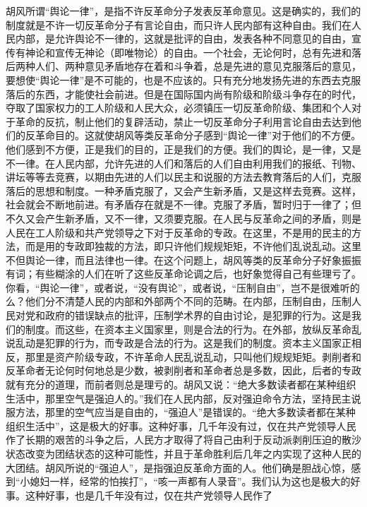 \documentclass[cn,11pt,chinese]{elegantbook}
\begin{document}
胡风所谓“舆论一律”，是指不许反革命分子发表反革命意见。这是确实的，我们的制度就是不许一切反革命分子有言论自由，而只许人民内部有这种自由。我们在人民内部，是允许舆论不一律的，这就是批评的自由，发表各种不同意见的自由，宣传有神论和宣传无神论（即唯物论）的自由。一个社会，无论何时，总有先进和落后两种人们、两种意见矛盾地存在着和斗争着，总是先进的意见克服落后的意见，要想使“舆论一律”是不可能的，也是不应该的。只有充分地发扬先进的东西去克服落后的东西，才能使社会前进。但是在国际国内尚有阶级和阶级斗争存在的时代，夺取了国家权力的工人阶级和人民大众，必须镇压一切反革命阶级、集团和个人对于革命的反抗，制止他们的复辟活动，禁止一切反革命分子利用言论自由去达到他们的反革命目的。这就使胡风等类反革命分子感到“舆论一律”对于他们的不方便。他们感到不方便，正是我们的目的，正是我们的方便。我们的舆论，是一律，又是不一律。在人民内部，允许先进的人们和落后的人们自由利用我们的报纸、刊物、讲坛等等去竞赛，以期由先进的人们以民主和说服的方法去教育落后的人们，克服落后的思想和制度。一种矛盾克服了，又会产生新矛盾，又是这样去竞赛。这样，社会就会不断地前进。有矛盾存在就是不一律。克服了矛盾，暂时归于一律了；但不久又会产生新矛盾，又不一律，又须要克服。在人民与反革命之间的矛盾，则是人民在工人阶级和共产党领导之下对于反革命的专政。在这里，不是用的民主的方法，而是用的专政即独裁的方法，即只许他们规规矩矩，不许他们乱说乱动。这里不但舆论一律，而且法律也一律。在这个问题上，胡风等类的反革命分子好象振振有词；有些糊涂的人们在听了这些反革命论调之后，也好象觉得自己有些理亏了。你看，“舆论一律”，或者说，“没有舆论”，或者说，“压制自由”，岂不是很难听的么？他们分不清楚人民的内部和外部两个不同的范畴。在内部，压制自由，压制人民对党和政府的错误缺点的批评，压制学术界的自由讨论，是犯罪的行为。这是我们的制度。而这些，在资本主义国家里，则是合法的行为。在外部，放纵反革命乱说乱动是犯罪的行为，而专政是合法的行为。这是我们的制度。资本主义国家正相反，那里是资产阶级专政，不许革命人民乱说乱动，只叫他们规规矩矩。剥削者和反革命者无论何时何地总是少数，被剥削者和革命者总是多数，因此，后者的专政就有充分的道理，而前者则总是理亏的。胡风又说：“绝大多数读者都在某种组织生活中，那里空气是强迫人的。”我们在人民内部，反对强迫命令方法，坚持民主说服方法，那里的空气应当是自由的，“强迫人”是错误的。“绝大多数读者都在某种组织生活中”，这是极大的好事。这种好事，几千年没有过，仅在共产党领导人民作了长期的艰苦的斗争之后，人民方才取得了将自己由利于反动派剥削压迫的散沙状态改变为团结状态的这种可能性，并且于革命胜利后几年之内实现了这种人民的大团结。胡风所说的“强迫人”，是指强迫反革命方面的人。他们确是胆战心惊，感到“小媳妇一样，经常的怕挨打”，“咳一声都有人录音”。我们认为这也是极大的好事。这种好事，也是几千年没有过，仅在共产党领导人民作了
\end{document}
